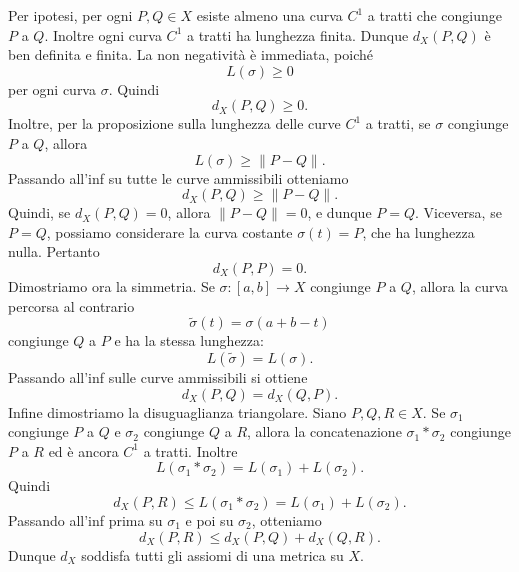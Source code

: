 \documentclass[a4paper]{article}
\begin{document}
\begin{snippetproof}{}
    Per ipotesi, per ogni \(P,Q\in X\) esiste almeno una curva \(C^1\) a tratti che congiunge \(P\) a \(Q\). Inoltre ogni curva \(C^1\) a tratti ha lunghezza finita. Dunque \(d_X(P,Q)\) è ben definita e finita.
    La non negatività è immediata, poiché
    \[
        L(\sigma)\geq 0
    \]
    per ogni curva \(\sigma\). Quindi
    \[
        d_X(P,Q)\geq 0.
    \]
    Inoltre, per la proposizione sulla lunghezza delle curve \(C^1\) a tratti, se \(\sigma\) congiunge \(P\) a \(Q\), allora
    \[
        L(\sigma)\geq \left\|P-Q\right\|.
    \]
    Passando all'inf su tutte le curve ammissibili otteniamo
    \[
        d_X(P,Q)\geq \left\|P-Q\right\|.
    \]
    Quindi, se \(d_X(P,Q)=0\), allora \(\left\|P-Q\right\|=0\), e dunque \(P=Q\). Viceversa, se \(P=Q\), possiamo considerare la curva costante \(\sigma(t)=P\), che ha lunghezza nulla. Pertanto
    \[
        d_X(P,P)=0.
    \]
    Dimostriamo ora la simmetria. Se \(\sigma\colon[a,b]\to X\) congiunge \(P\) a \(Q\), allora la curva percorsa al contrario
    \[
        \widetilde{\sigma}(t)=\sigma(a+b-t)
    \]
    congiunge \(Q\) a \(P\) e ha la stessa lunghezza:
    \[
        L(\widetilde{\sigma})=L(\sigma).
    \]
    Passando all'inf sulle curve ammissibili si ottiene
    \[
        d_X(P,Q)=d_X(Q,P).
    \]
    Infine dimostriamo la disuguaglianza triangolare. Siano \(P,Q,R\in X\). Se \(\sigma_1\) congiunge \(P\) a \(Q\) e \(\sigma_2\) congiunge \(Q\) a \(R\), allora la concatenazione \(\sigma_1*\sigma_2\) congiunge \(P\) a \(R\) ed è ancora \(C^1\) a tratti. Inoltre
    \[
        L(\sigma_1*\sigma_2)=L(\sigma_1)+L(\sigma_2).
    \]
    Quindi
    \[
        d_X(P,R)\leq L(\sigma_1*\sigma_2)=L(\sigma_1)+L(\sigma_2).
    \]
    Passando all'inf prima su \(\sigma_1\) e poi su \(\sigma_2\), otteniamo
    \[
        d_X(P,R)\leq d_X(P,Q)+d_X(Q,R).
    \]
    Dunque \(d_X\) soddisfa tutti gli assiomi di una metrica su \(X\).
\end{snippetproof}
\end{document}
